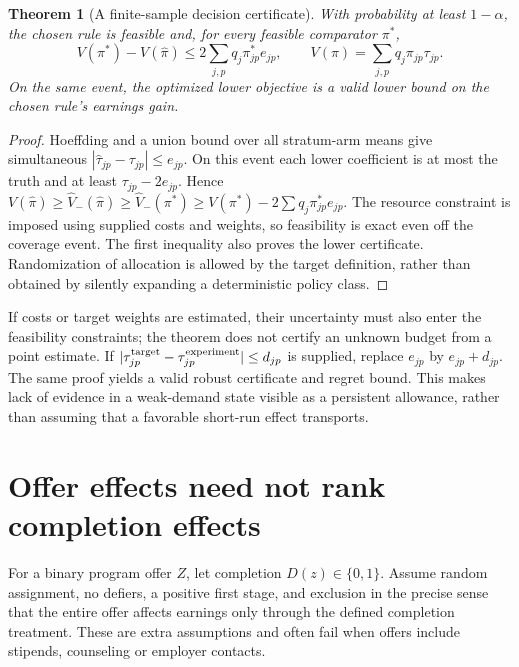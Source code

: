 \documentclass[11pt]{article}
\newtheorem{theorem}{Theorem}
\theoremstyle{remark}
\begin{document}
\begin{theorem}[A finite-sample decision certificate]
With probability at least $1-\alpha$, the chosen rule is feasible and, for every feasible comparator $\pi^*$,
\[
 V(\pi^*)-V(\widehat\pi)\le2\sum_{j,p}q_j\pi^*_{jp}e_{jp},
 \qquad V(\pi)=\sum_{j,p}q_j\pi_{jp}\tau_{jp}.
\]
On the same event, the optimized lower objective is a valid lower bound on the chosen rule's earnings gain.
\end{theorem}
\begin{proof}
Hoeffding and a union bound over all stratum-arm means give simultaneous $|\widehat\tau_{jp}-\tau_{jp}|\le e_{jp}$. On this event each lower coefficient is at most the truth and at least $\tau_{jp}-2e_{jp}$. Hence
$V(\widehat\pi)\ge\widehat V_-(\widehat\pi)\ge\widehat V_-(\pi^*)\ge V(\pi^*)-2\sum q_j\pi^*_{jp}e_{jp}$.
The resource constraint is imposed using supplied costs and weights, so feasibility is exact even off the coverage event. The first inequality also proves the lower certificate. Randomization of allocation is allowed by the target definition, rather than obtained by silently expanding a deterministic policy class.
\end{proof}
If costs or target weights are estimated, their uncertainty must also enter the feasibility constraints; the theorem does not certify an unknown budget from a point estimate. If $|\tau_{jp}^{\rm target}-\tau_{jp}^{\rm experiment}|\le d_{jp}$ is supplied, replace $e_{jp}$ by $e_{jp}+d_{jp}$. The same proof yields a valid robust certificate and regret bound. This makes lack of evidence in a weak-demand state visible as a persistent allowance, rather than assuming that a favorable short-run effect transports.

\section*{Offer effects need not rank completion effects}
For a binary program offer $Z$, let completion $D(z)\in\{0,1\}$. Assume random assignment, no defiers, a positive first stage, and exclusion in the precise sense that the entire offer affects earnings only through the defined completion treatment. These are extra assumptions and often fail when offers include stipends, counseling or employer contacts.
\end{document}
